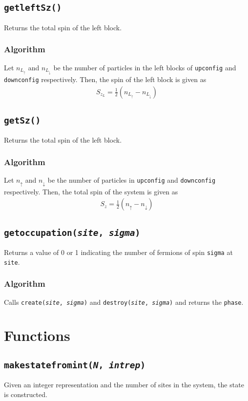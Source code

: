 \documentclass[]{book}
\begin{document}
\subsection{\texttt{getleftSz()}}
Returns the total spin of the left block.
\subsubsection*{Algorithm}
Let $n_{L_{\uparrow}}$ and $n_{L_{\downarrow}}$ be the number of particles in the left blocks of \texttt{upconfig} and \texttt{downconfig} respectively. Then, the spin of the left block is given as
\begin{align}
S_{z_{L}} = \frac{1}{2}  \left( n_{L_{\uparrow}} - n_{L_{\downarrow}} \right) 
\end{align}

\subsection{\texttt{getSz()}}
Returns the total spin of the left block.
\subsubsection*{Algorithm}
Let $n_{{\uparrow}}$ and $n_{{\downarrow}}$ be the number of particles in \texttt{upconfig} and \texttt{downconfig} respectively. Then, the total spin of the system is given as
\begin{align}
S_{z} = \frac{1}{2}  \left( n_{{\uparrow}} - n_{{\downarrow}} \right) 
\end{align}

\subsection{\texttt{getoccupation(\textit{site}, \textit{sigma})}}
Returns a value of 0 or 1 indicating the number of fermions of spin \texttt{sigma} at \texttt{site}.

\subsubsection*{Algorithm}
Calls \texttt{create(\textit{site}, \textit{sigma})} and \texttt{destroy(\textit{site}, \textit{sigma})} and returns the \texttt{phase}.

\section{Functions}
\subsection{\texttt{makestatefromint(\textit{N}, \textit{intrep})}}
Given an integer representation and the number of sites in the system, the state is constructed.
\end{document}
